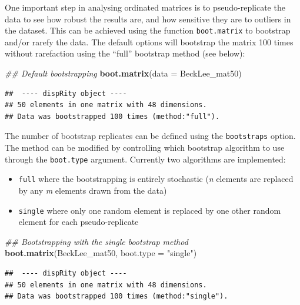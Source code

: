\documentclass[
]{book}
\newenvironment{Shaded}{\begin{snugshade}}{\end{snugshade}}
\newcommand{\CommentTok}[1]{\textcolor[rgb]{0.56,0.35,0.01}{\textit{#1}}}
\newcommand{\DataTypeTok}[1]{\textcolor[rgb]{0.13,0.29,0.53}{#1}}
\newcommand{\KeywordTok}[1]{\textcolor[rgb]{0.13,0.29,0.53}{\textbf{#1}}}
\newcommand{\NormalTok}[1]{#1}
\newcommand{\StringTok}[1]{\textcolor[rgb]{0.31,0.60,0.02}{#1}}
\providecommand{\tightlist}{%
  \setlength{\itemsep}{0pt}\setlength{\parskip}{0pt}}
\begin{document}
One important step in analysing ordinated matrices is to pseudo-replicate the data to see how robust the results are, and how sensitive they are to outliers in the dataset.
This can be achieved using the function \texttt{boot.matrix} to bootstrap and/or rarefy the data.
The default options will bootstrap the matrix 100 times without rarefaction using the ``full'' bootstrap method (see below):

\begin{Shaded}
\begin{Highlighting}[]
\CommentTok{\#\# Default bootstrapping}
\KeywordTok{boot.matrix}\NormalTok{(}\DataTypeTok{data =}\NormalTok{ BeckLee\_mat50)}
\end{Highlighting}
\end{Shaded}

\begin{verbatim}
##  ---- dispRity object ---- 
## 50 elements in one matrix with 48 dimensions.
## Data was bootstrapped 100 times (method:"full").
\end{verbatim}

The number of bootstrap replicates can be defined using the \texttt{bootstraps} option.
The method can be modified by controlling which bootstrap algorithm to use through the \texttt{boot.type} argument.
Currently two algorithms are implemented:

\begin{itemize}
\tightlist
\item
  \texttt{full} where the bootstrapping is entirely stochastic (\emph{n} elements are replaced by any \emph{m} elements drawn from the data)
\item
  \texttt{single} where only one random element is replaced by one other random element for each pseudo-replicate
\end{itemize}

\begin{Shaded}
\begin{Highlighting}[]
\CommentTok{\#\# Bootstrapping with the single bootstrap method}
\KeywordTok{boot.matrix}\NormalTok{(BeckLee\_mat50, }\DataTypeTok{boot.type =} \StringTok{"single"}\NormalTok{)}
\end{Highlighting}
\end{Shaded}

\begin{verbatim}
##  ---- dispRity object ---- 
## 50 elements in one matrix with 48 dimensions.
## Data was bootstrapped 100 times (method:"single").
\end{verbatim}
\end{document}
